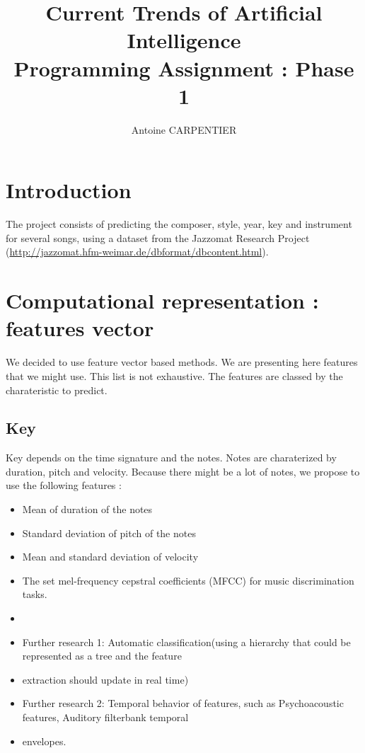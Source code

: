 \documentclass[a4paper,12pt]{article}
\author{Antoine CARPENTIER}
\title{Current Trends of Artificial Intelligence\\ \small Programming Assignment : Phase 1}
\begin{document}
\maketitle

\section{Introduction}

The project consists of predicting the composer, style, year, key and instrument for several songs, using a dataset from the Jazzomat Research Project (\url{http://jazzomat.hfm-weimar.de/dbformat/dbcontent.html}).

\section{Computational representation : features vector}

We decided to use feature vector based methods. We are presenting here features that we might use. This list is not exhaustive. The features are classed by the charateristic to predict.

\subsection{Key}

Key depends on the time signature and the notes. Notes are charaterized by duration, pitch and velocity. Because there might be a lot of notes, we propose to use the following features :

\begin{itemize}
    \item Mean of duration of the notes
    \item Standard deviation of pitch of the notes
    \item Mean and standard deviation of velocity
    \item The set mel-frequency cepstral coefficients (MFCC) for music discrimination tasks.
    \item
    
    
    
    \item Further research 1: Automatic classification(using a hierarchy that could be represented as a tree and the feature       \item extraction should update in real time)
    \item Further research 2: Temporal behavior of features, such as Psychoacoustic features, Auditory filterbank temporal         \item envelopes.
    
\end{itemize}
\end{document}
